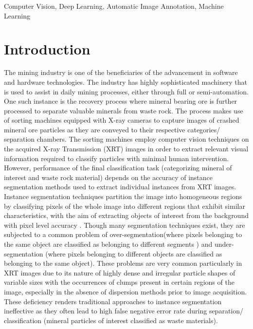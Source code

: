 \documentclass[conference]{IEEEtran}
\begin{document}
\begin{IEEEkeywords}
Computer Vision, Deep Learning, Automatic Image Annotation, Machine Learning
\end{IEEEkeywords}

\section{Introduction}
	The mining industry is one of the beneficiaries of the advancement in software and hardware
technologies. The industry has highly sophisticated machinery that is used to assist in daily
mining processes, either through full or semi-automation. One such instance is the recovery
process where mineral bearing ore is further processed to separate valuable minerals from
waste rock. The process makes use of sorting machines equipped with X-ray
cameras to capture images of crashed mineral ore particles as they are conveyed to their
respective categories/ separation chambers. The sorting machines employ computer vision techniques on the acquired
 X-ray Transmission (XRT) images in order to extract relevant visual information required
to classify particles with minimal human intervention.\\

	However, performance of the final classification task (categorizing mineral of interest and waste rock material) depends on the accuracy of instance segmentation methods used to
extract individual instances from XRT images. Instance segmentation techniques partition the image into homogeneous regions by classifying pixels of the whole image into different regions that exhibit similar characteristics, with the aim of extracting objects of interest from
the background with pixel level accuracy \cite{b1}. Though many segmentation techniques exist,
they are subjected to a common problem of over-segmentation(where pixels belonging to
the same object are classified as belonging to different segments ) and under-segmentation
(where pixels belonging to different objects are classified as belonging to the same object).
These problems are very common particularly in XRT images due to its nature of highly
 dense and irregular particle shapes of variable sizes with the occurrences of clumps present
in certain regions of the image, especially in the absence of dispersion methods prior to
 image acquisition.
 These deficiency renders traditional approaches to instance segmentation ineffective as
they often lead to high false negative error rate during separation/ classification (mineral particles of interest classified as waste materials).\\
\end{document}

